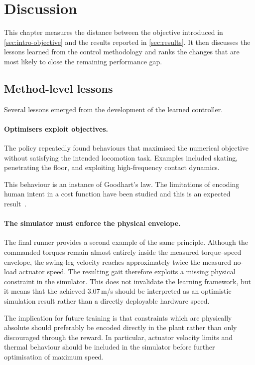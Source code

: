 \section{Discussion}
\label{sec:discussion}

This chapter measures the distance between the objective introduced in \cref{sec:intro-objective} and the results reported in \cref{sec:results}.
It then discusses the lessons learned from the control methodology and ranks the changes that are most likely to close the remaining performance gap.

\subsection{Method-level lessons}

Several lessons emerged from the development of the learned controller.

\paragraph{Optimisers exploit objectives.}
The policy repeatedly found behaviours that maximised the numerical objective without satisfying the intended locomotion task.
Examples included skating, penetrating the floor, and exploiting high-frequency contact dynamics.

This behaviour is an instance of Goodhart's law.
The limitations of encoding human intent in a cost function have been studied and this is an expected result~\cite{maier2025goodhart}.

\paragraph{The simulator must enforce the physical envelope.}
The final runner provides a second example of the same principle.
Although the commanded torques remain almost entirely inside the measured torque--speed envelope, the swing-leg velocity reaches approximately twice the measured no-load actuator speed.
The resulting gait therefore exploits a missing physical constraint in the simulator.
This does not invalidate the learning framework, but it means that the achieved 3.07\,m/s should be interpreted as an optimistic simulation result rather than a directly deployable hardware speed.

The implication for future training is that constraints which are physically absolute should preferably be encoded directly in the plant rather than only discouraged through the reward.
In particular, actuator velocity limits and thermal behaviour should be included in the simulator before further optimisation of maximum speed.

